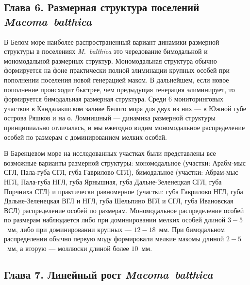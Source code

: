 {\subsection*{Глава 6. Размерная структура поселений \textit{Macoma~balthica}}
В Белом море наиболее распространенный вариант динамики размерной структуры в поселениях {\it M.~balthica} это чередование бимодальной и мономодальной размерных структур.
Мономодальная структура обычно формируется на фоне практически полной элиминации крупных особей при пополнении поселения новой генерацией маком.
В дальнейшем, если новое пополнение происходит быстрее, чем предыдущая генерация элиминирует, то формируется бимодальная размерная структура.
Среди 6 мониторинговых участков в Кандалакшском заливе Белого моря для двух из них --- в Южной губе острова Ряшков и на о. Ломнишный --- динамика размерной структуры принципиально отличалась, и мы ежегодно видим мономодальное распределение особей по размерам с доминированием мелких особей.

В Баренцевом море на исследованных участках были представлены все возможные варианты размерной структуры: мономодальное (участки: Арабм-мыс СГЛ, Пала-губа СГЛ, губа Гаврилово СГЛ), бимодальное (участки: Абрам-мыс НГЛ, Пала-губа НГЛ, губа Ярнышная, губа Дальне-Зеленецкая СГЛ, губа Порчниха СГЛ) и практически равномерное (участки: губа Гаврилово НГЛ, губа Дальне-Зеленецкая ВГЛ и НГЛ, губа Шельпино ВГЛ и СГЛ, губа Ивановская ВСЛ) распределение особей по размерам. 
Мономодальное распределение особей по размерам наблюдается либо при доминировании мелких особей длиной $3-5$~мм, либо при доминировании крупных --- $12-18$~мм.
При бимодальном распределении обычно первую моду формировали мелкие макомы длиной $2-5$~мм, а вторую --- моллюски длиной более $10$~мм.

\subsection*{Глава 7. Линейный рост \textit{Macoma~balthica}}

}
